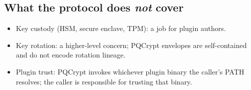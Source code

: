\subsection{What the protocol does \emph{not} cover}

\begin{itemize}
\item Key custody (HSM, secure enclave, TPM): a job for plugin authors.
\item Key rotation: a higher-level concern; PQCrypt envelopes are self-contained and do not encode rotation lineage.
\item Plugin trust: PQCrypt invokes whichever plugin binary the caller's PATH resolves; the caller is responsible for trusting that binary.
\end{itemize}

